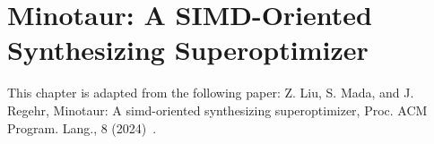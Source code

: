 \chapter{Minotaur: A SIMD-Oriented Synthesizing Superoptimizer}
\label{chap:minotaur}

This chapter is adapted from the following paper:
Z. Liu, S. Mada, and J. Regehr, Minotaur:
A simd-oriented synthesizing superoptimizer, Proc. ACM Program.
Lang., 8 (2024)~\cite{minotaur}.







